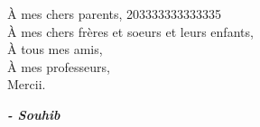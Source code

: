 
\begin{fquote}
\begin{center}
\large{

\uppercase{à} mes chers parents, 203333333333335 \\[12pt]
\uppercase{à} mes chers frères et soeurs et leurs enfants,\\[12pt]
\uppercase{à} tous mes amis,\\[12pt]
\uppercase{à} mes professeurs,\\[12pt]
Mercii.
}
\end{center}
\bigskip
\medskip
\end{fquote}

\begin{adjustwidth}{2cm}{1cm}
\hspace*{\fill} \textbf{\textit{\large{- Souhib}}}
\end{adjustwidth}

\clearpage
